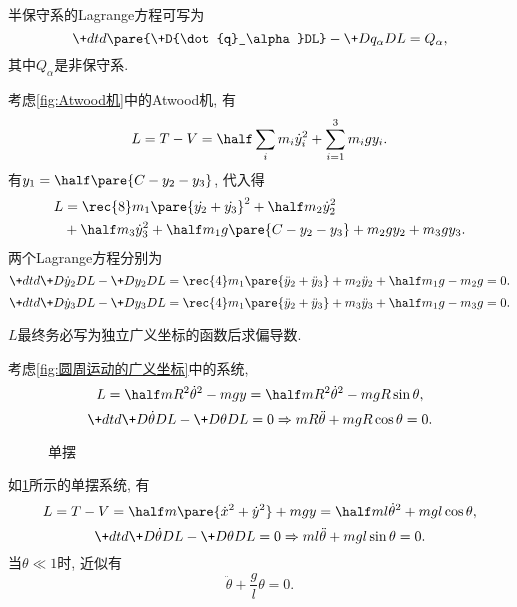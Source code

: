 \documentclass{ctexart}
\begin{document}
\begin{remark}
    半保守系的Lagrange方程可写为
    \[ \+dtd{}\pare{\+D{\dot{q}_\alpha}DL} - \+D{q_\alpha}D{L} = Q_\alpha, \]
    其中$Q_\alpha$是非保守系.
\end{remark}
\begin{sample}
    \begin{ex}
        考虑\cref{fig:Atwood机}中的Atwood机, 有
        \[ L = T-V = \half\sum_i m_i \dot{y}_i^2 + \sum_{i=1}^3 m_i gy_i. \]
        有$\displaystyle y_1 = \half\pare{C - y_2 - y_3}$, 代入得
        \begin{align*}
            L &= \rec{8}m_1\pare{\dot{y_2}+\dot{y_3}}^2 + \half m_2\dot{y}_2^2 \\ &+ \half m_3\dot{y}_3^2 + \half m_1g\pare{C-y_2 - y_3} + m_2 gy_2 + m_3gy_3. 
        \end{align*}
        两个Lagrange方程分别为
        \[ \+dtd{}\+D{\dot{y}_2}DL - \+D{y_2}DL = \rec{4}m_1\pare{\ddot{y}_2 + \ddot{y}_3} + m_2\ddot{y}_2 + \half m_1 g - m_2 g = 0. \]
        \[ \+dtd{}\+D{\dot{y}_3}DL - \+D{y_3}DL = \rec{4}m_1\pare{\ddot{y}_2 + \ddot{y}_3} + m_3\ddot{y}_3 + \half m_1 g - m_3 g = 0. \]
    \end{ex}
\end{sample}
\begin{pitfall}
    $L$最终务必写为独立广义坐标的函数后求偏导数.
\end{pitfall}
\begin{sample}
    \begin{ex}
        考虑\cref{fig:圆周运动的广义坐标}中的系统,
        \[ L = \half mR^2\dot{\theta}^2 - mgy = \half mR^2\dot{\theta}^2 - mgR\sin\theta, \]
        \[ \+dtd{}\+D{\dot{\theta}}DL - \+D{\theta}DL = 0\Rightarrow mR\ddot{\theta} + mgR\cos\theta = 0. \]
    \end{ex}
\end{sample}
\begin{figure}[ht]
    \centering
    \caption{单摆}
    \label{fig:单摆}
\end{figure}
\begin{sample}
    \begin{ex}
        如\cref{fig:单摆}所示的单摆系统, 有
        \[ L = T-V = \half m\pare{\dot{x}^2 + \dot{y}^2} + mgy = \half ml\dot{\theta}^2 + mgl\cos\theta, \]
        \[ \+dtd{}\+D{\dot{\theta}}DL - \+D{\theta}DL = 0\Rightarrow ml\ddot{\theta} + mgl\sin\theta = 0. \]
        当$\theta \ll 1$时, 近似有
        \[ \ddot{\theta} + \frac{g}{l} \theta = 0. \]
    \end{ex}
\end{sample}
\end{document}

